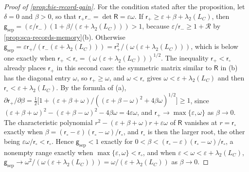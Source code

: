 \begin{proof}[Proof of \cref{prop:hie-record-gain}]
For the condition stated after the proposition, let $\delta=0$ and $\beta>0$, so that $\mathsf r_+\mathsf r_-=\det\mathsf R=\varepsilon\omega$. If $\mathsf r_+\ge\varepsilon+\beta+\lambda_2(L_C)$, then $\mathsf g_{\mathrm{sep}}=(\varepsilon/\mathsf r_-)(1+\beta/(\varepsilon+\lambda_2(L_C)))>1$, because $\varepsilon/\mathsf r_-\ge1+\mathcal R$ by \cref{prop:sca-records-memory}(b). Otherwise $\mathsf g_{\mathrm{sep}}=\varepsilon\mathsf r_+/(\mathsf r_-(\varepsilon+\lambda_2(L_C)))=\mathsf r_+^2/(\omega(\varepsilon+\lambda_2(L_C)))$, which is below one exactly when $\mathsf r_+<\mathsf r_\circ=(\omega(\varepsilon+\lambda_2(L_C)))^{1/2}$. The inequality $\mathsf r_+<\mathsf r_\circ$ already places $\mathsf r_+$ in this second case: the symmetric matrix similar to $\mathsf R$ in (b) has the diagonal entry $\omega$, so $\mathsf r_+\ge\omega$, and $\omega<\mathsf r_\circ$ gives $\omega<\varepsilon+\lambda_2(L_C)$ and then $\mathsf r_\circ<\varepsilon+\lambda_2(L_C)$. By the formula of (a), $\partial\mathsf r_+/\partial\beta=\frac12\bigl[1+(\varepsilon+\beta+\omega)/((\varepsilon+\beta-\omega)^2+4\beta\omega)^{1/2}\bigr]\ge1$, since $(\varepsilon+\beta+\omega)^2-(\varepsilon+\beta-\omega)^2-4\beta\omega=4\varepsilon\omega$, and $\mathsf r_+\to\max\{\varepsilon,\omega\}$ as $\beta\to0$. The characteristic polynomial $r^2-(\varepsilon+\beta+\omega)r+\varepsilon\omega$ of $\mathsf R$ vanishes at $r=\mathsf r_\circ$ exactly when $\beta=(\mathsf r_\circ-\varepsilon)(\mathsf r_\circ-\omega)/\mathsf r_\circ$, and $\mathsf r_\circ$ is then the larger root, the other being $\varepsilon\omega/\mathsf r_\circ<\mathsf r_\circ$. Hence $\mathsf g_{\mathrm{sep}}<1$ exactly for $0<\beta<(\mathsf r_\circ-\varepsilon)(\mathsf r_\circ-\omega)/\mathsf r_\circ$, a nonempty range exactly when $\max\{\varepsilon,\omega\}<\mathsf r_\circ$, and when $\varepsilon<\omega<\varepsilon+\lambda_2(L_C)$, $\mathsf g_{\mathrm{sep}}\to\omega^2/(\omega(\varepsilon+\lambda_2(L_C)))=\omega/(\varepsilon+\lambda_2(L_C))$ as $\beta\to0$.
\end{proof}

